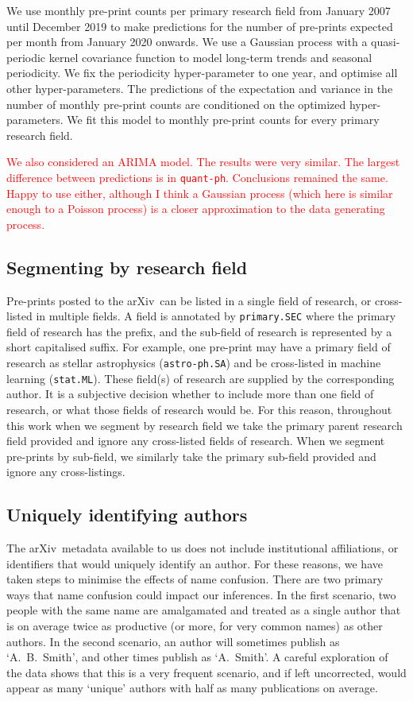 \documentclass[a4paper,12pt]{article}
\newcommand{\todo}[1]{\textcolor{red}{#1}}
\newcommand{\arxiv}{arXiv}
\begin{document}
We use monthly pre-print counts per primary research field from January 2007 until December 2019 to make predictions for the number of pre-prints expected per month from January 2020 onwards. We use a Gaussian process with a quasi-periodic kernel covariance function to model long-term trends and seasonal periodicity\cite{Rasmussen:2006,Ambikasaran:2014}. We fix the periodicity hyper-parameter to one year, and optimise all other hyper-parameters. The predictions of the expectation and variance in the number of monthly pre-print counts are conditioned on the optimized hyper-parameters. We fit this model to monthly pre-print counts for every primary research field.

\todo{We also considered an ARIMA model. The results were very similar. The largest difference between predictions is in \texttt{quant-ph}. Conclusions remained the same. Happy to use either, although I think a Gaussian process (which here is similar enough to a Poisson process) is a closer approximation to the data generating process.}

\subsection*{Segmenting by research field}

Pre-prints posted to the \arxiv\ can be listed in a single field of research, or cross-listed in multiple fields. A field is annotated by \texttt{primary.SEC} where the primary field of research has the prefix, and the sub-field of research is represented by a short capitalised suffix. For example, one pre-print may have a primary field of research as stellar astrophysics (\texttt{astro-ph.SA}) and be cross-listed in machine learning (\texttt{stat.ML}). These field(s) of research are supplied by the corresponding author. It is a subjective decision whether to include more than one field of research, or what those fields of research would be. For this reason, throughout this work when we segment by research field we take the primary parent research field provided and ignore any cross-listed fields of research. When we segment pre-prints by sub-field, we similarly take the primary sub-field provided and ignore any cross-listings.


\subsection*{Uniquely identifying authors}

The \arxiv\ metadata available to us does not include institutional affiliations, or identifiers that would uniquely identify an author. For these reasons, we have taken steps to minimise the effects of name confusion. There are two primary ways that name confusion could impact our inferences. In the first scenario, two people with the same name are amalgamated and treated as a single author that is on average twice as productive (or more, for very common names) as other authors. In the second scenario, an author will sometimes publish as `A.~B.~Smith', and other times publish as `A.~Smith'. A careful exploration of the data shows that this is a very frequent scenario, and if left uncorrected, would appear as many `unique' authors with half as many publications on average.
\end{document}
